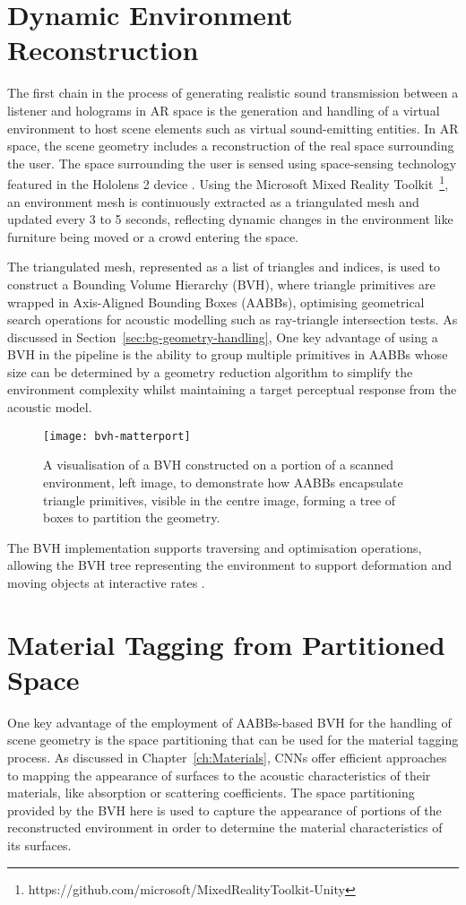 \section{Dynamic Environment Reconstruction}
The first chain in the process of generating realistic sound transmission between a listener and holograms in AR space is the generation and handling of a virtual environment to host scene elements such as virtual sound-emitting entities. In AR space, the scene geometry includes a reconstruction of the real space surrounding the user. The space surrounding the user is sensed using space-sensing technology featured in the Hololens 2 device \cite{ungureanu2020hololens}. Using the Microsoft Mixed Reality Toolkit~\footnote{https://github.com/microsoft/MixedRealityToolkit-Unity}, an environment mesh is continuously extracted as a triangulated mesh and updated every 3 to 5 seconds, reflecting dynamic changes in the environment like furniture being moved or a crowd entering the space.\par
The triangulated mesh, represented as a list of triangles and indices, is used to construct a Bounding Volume Hierarchy (BVH), where triangle primitives are wrapped in Axis-Aligned Bounding Boxes (AABBs), optimising geometrical search operations for acoustic modelling such as ray-triangle intersection tests. As discussed in Section~\ref{sec:bg-geometry-handling}, One key advantage of using a BVH in the pipeline is the ability to group multiple primitives in AABBs whose size can be determined by a geometry reduction algorithm to simplify the environment complexity whilst maintaining a target perceptual response from the acoustic model. \par
\begin{figure}[htb]
    \centering
    \texttt{[image: bvh-matterport]}
    \caption{A visualisation of a BVH constructed on a portion of a scanned environment, left image, to demonstrate how AABBs encapsulate triangle primitives, visible in the centre image, forming a tree of boxes to partition the geometry.}
\label{fig:bvh-visualisation}
\end{figure}
The BVH implementation supports traversing and optimisation operations, allowing the BVH tree representing the environment to support deformation and moving objects at interactive rates \cite{wald2007ray}.

\section{Material Tagging from Partitioned Space}
One key advantage of the employment of AABBs-based BVH for the handling of scene geometry is the space partitioning that can be used for the material tagging process. As discussed in Chapter~\ref{ch:Materials}, CNNs offer efficient approaches to mapping the appearance of surfaces to the acoustic characteristics of their materials, like absorption or scattering coefficients. The space partitioning provided by the BVH here is used to capture the appearance of portions of the reconstructed environment in order to determine the material characteristics of its surfaces.\par

